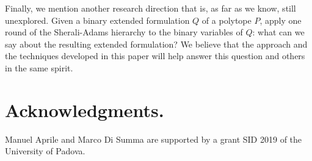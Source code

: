 \documentclass[11pt,a4paper]{article}
\newcommand{\1}{\textbf{1}}
\begin{document}
Finally, we mention another research direction that is, as far as we know, still unexplored. Given a binary extended formulation $Q$ of a polytope $P$, apply one round of the Sherali-Adams hierarchy \cite{sherali1990hierarchy} to the binary variables of $Q$: what can we say about the resulting extended formulation? We believe that the approach and the techniques developed in this paper will help answer this question and others in the same spirit.

\section*{Acknowledgments.}
Manuel Aprile and Marco Di Summa are supported by a grant SID 2019 of the University of Padova.

\printbibliography
\end{document}

